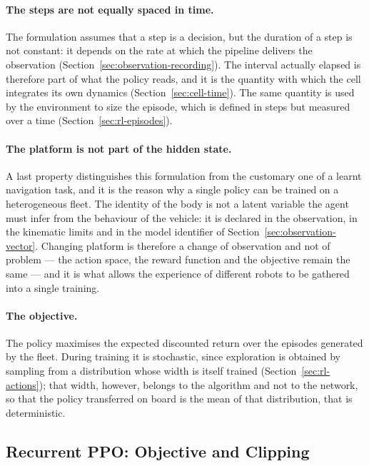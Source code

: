 \paragraph{The steps are not equally spaced in time.}
The formulation assumes that a step is a decision, but the duration of a step is
not constant: it depends on the rate at which the pipeline delivers the
observation (Section~\ref{sec:observation-recording}). The interval actually
elapsed is therefore part of what the policy reads, and it is the quantity with
which the cell integrates its own dynamics (Section~\ref{sec:cell-time}). The
same quantity is used by the environment to size the episode, which is defined
in steps but measured over a time (Section~\ref{sec:rl-episodes}).

\paragraph{The platform is not part of the hidden state.}
A last property distinguishes this formulation from the customary one of a
learnt navigation task, and it is the reason why a single policy can be trained
on a heterogeneous fleet. The identity of the body is not a latent variable the
agent must infer from the behaviour of the vehicle: it is declared in the
observation, in the kinematic limits and in the model identifier of
Section~\ref{sec:observation-vector}. Changing platform is therefore a change of
observation and not of problem --- the action space, the reward function and the
objective remain the same --- and it is what allows the experience of different
robots to be gathered into a single training.

\paragraph{The objective.}
The policy maximises the expected discounted return over the episodes generated
by the fleet. During training it is stochastic, since exploration is obtained by
sampling from a distribution whose width is itself trained
(Section~\ref{sec:rl-actions}); that width, however, belongs to the algorithm
and not to the network, so that the policy transferred on board is the mean of
that distribution, that is deterministic.

\subsection{Recurrent PPO: Objective and Clipping}
\label{sec:rppo-gae}

